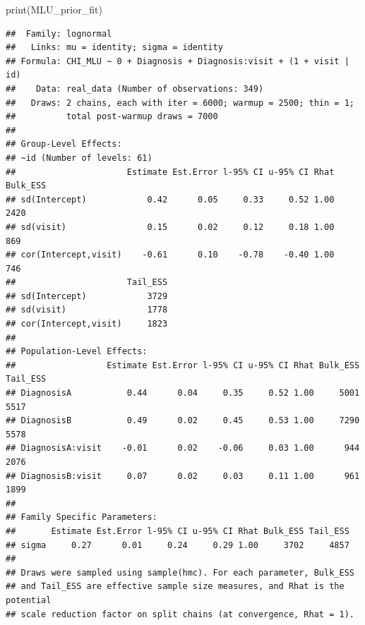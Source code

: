 \documentclass[
]{article}
\newenvironment{Shaded}{\begin{snugshade}}{\end{snugshade}}
\newcommand{\FunctionTok}[1]{\textcolor[rgb]{0.00,0.00,0.00}{#1}}
\newcommand{\NormalTok}[1]{#1}
\begin{document}
\begin{Shaded}
\begin{Highlighting}[]
\FunctionTok{print}\NormalTok{(MLU\_prior\_fit)}
\end{Highlighting}
\end{Shaded}

\begin{verbatim}
##  Family: lognormal 
##   Links: mu = identity; sigma = identity 
## Formula: CHI_MLU ~ 0 + Diagnosis + Diagnosis:visit + (1 + visit | id) 
##    Data: real_data (Number of observations: 349) 
##   Draws: 2 chains, each with iter = 6000; warmup = 2500; thin = 1;
##          total post-warmup draws = 7000
## 
## Group-Level Effects: 
## ~id (Number of levels: 61) 
##                      Estimate Est.Error l-95% CI u-95% CI Rhat Bulk_ESS
## sd(Intercept)            0.42      0.05     0.33     0.52 1.00     2420
## sd(visit)                0.15      0.02     0.12     0.18 1.00      869
## cor(Intercept,visit)    -0.61      0.10    -0.78    -0.40 1.00      746
##                      Tail_ESS
## sd(Intercept)            3729
## sd(visit)                1778
## cor(Intercept,visit)     1823
## 
## Population-Level Effects: 
##                  Estimate Est.Error l-95% CI u-95% CI Rhat Bulk_ESS Tail_ESS
## DiagnosisA           0.44      0.04     0.35     0.52 1.00     5001     5517
## DiagnosisB           0.49      0.02     0.45     0.53 1.00     7290     5578
## DiagnosisA:visit    -0.01      0.02    -0.06     0.03 1.00      944     2076
## DiagnosisB:visit     0.07      0.02     0.03     0.11 1.00      961     1899
## 
## Family Specific Parameters: 
##       Estimate Est.Error l-95% CI u-95% CI Rhat Bulk_ESS Tail_ESS
## sigma     0.27      0.01     0.24     0.29 1.00     3702     4857
## 
## Draws were sampled using sample(hmc). For each parameter, Bulk_ESS
## and Tail_ESS are effective sample size measures, and Rhat is the potential
## scale reduction factor on split chains (at convergence, Rhat = 1).
\end{verbatim}
\end{document}
